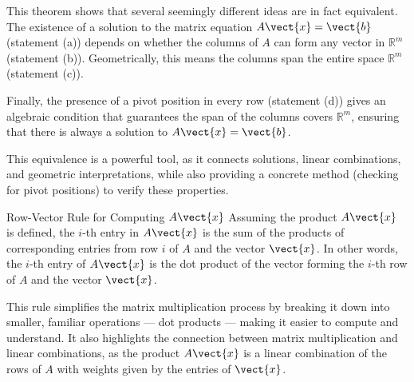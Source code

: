 This theorem shows that several seemingly different ideas are in fact equivalent. The existence of a solution to the matrix equation \( A \vect{x} = \vect{b} \) (statement (a)) depends on whether the columns of \( A \) can form any vector in \( \mathbb{R}^m \) (statement (b)). Geometrically, this means the columns span the entire space \( \mathbb{R}^m \) (statement (c)).

Finally, the presence of a pivot position in every row (statement (d)) gives an algebraic condition that guarantees the span of the columns covers \( \mathbb{R}^m \), ensuring that there is always a solution to \( A \vect{x} = \vect{b} \).

This equivalence is a powerful tool, as it connects solutions, linear combinations, and geometric interpretations, while also providing a concrete method (checking for pivot positions) to verify these properties.

\begin{custombox}{Row-Vector Rule for Computing \( A \vect{x} \)}
Assuming the product \( A \vect{x} \) is defined, the \( i \)-th entry in \( A \vect{x} \) is the sum of the products of corresponding entries from row \( i \) of \( A \) and the vector \( \vect{x} \). In other words, the \( i \)-th entry of \( A \vect{x} \) is the dot product of the vector forming the \( i \)-th row of \( A \) and the vector \( \vect{x} \).
    
\end{custombox}


This rule simplifies the matrix multiplication process by breaking it down into smaller, familiar operations — dot products — making it easier to compute and understand. It also highlights the connection between matrix multiplication and linear combinations, as the product \( A \vect{x} \) is a linear combination of the rows of \( A \) with weights given by the entries of \( \vect{x} \).

